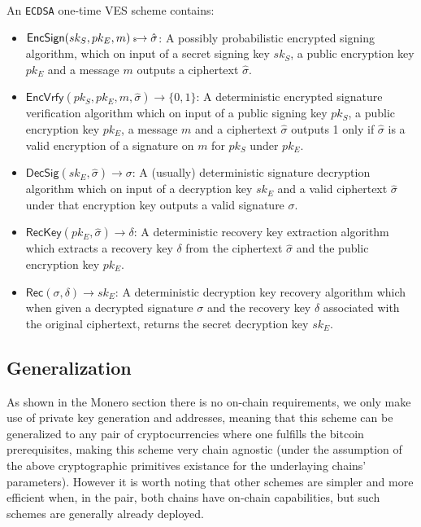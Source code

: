 \documentclass{llncs}
\newcommand{\EncSign}{\textsf{EncSign}}
\newcommand{\EncVer}{\textsf{EncVrfy}}
\newcommand{\DecSig}{\textsf{DecSig}}
\newcommand{\Rec}{\textsf{Rec}}
\newcommand{\RecKey}{\textsf{RecKey}}
\newcommand{\hatsigma}{\hat{\sigma}}
\newcommand{\skSign}{sk_S}
\newcommand{\pkSign}{pk_S}
\newcommand{\skEnc}{sk_E}
\newcommand{\pkEnc}{pk_E}
\newcommand{\rec}{\delta}
\newcommand{\bin}{\{0,1\}}
\begin{document}
\begin{definition}
    An \texttt{ECDSA} one-time VES scheme contains:
\begin{itemize}
    \item $\EncSign(\skSign, \pkEnc, m) \hskip2.3pt{\mbox{\tiny${\$}$\normalsize}}\!\!\rightarrow \hatsigma$: A possibly probabilistic encrypted signing algorithm, which on input of a secret signing key $\skSign$, a public encryption key $\pkEnc$ and a message $m$ outputs a ciphertext $\hatsigma$.
    \item $\EncVer(\pkSign, \pkEnc, m, \hatsigma) \rightarrow \bin$: A deterministic encrypted signature verification algorithm which on input of a public signing key $\pkSign$, a public encryption key $\pkEnc$, a message $m$ and a ciphertext $\hatsigma$ outputs 1 only if $\hatsigma$ is a valid encryption of a signature on $m$ for $\pkSign$ under $\pkEnc$.
    \item $\DecSig(\skEnc, \hatsigma) \rightarrow \sigma$: A (usually) deterministic signature decryption algorithm which on input of a decryption key $\skEnc$ and a valid ciphertext $\hatsigma$ under that encryption key  outputs a valid signature $\sigma$.
    \item $\RecKey(\pkEnc, \hatsigma) \rightarrow \delta$: A deterministic recovery key extraction algorithm which extracts a recovery key $\delta$ from the ciphertext $\hatsigma$ and the public encryption key $\pkEnc$.
    \item $\Rec(\sigma,\rec) \rightarrow \skEnc$: A deterministic decryption key recovery algorithm which when given a decrypted signature $\sigma$ and the recovery key $\rec$ associated with the original ciphertext, returns the secret decryption key $\skEnc$.
\end{itemize}
\end{definition}

\subsection{Generalization}
As shown in the Monero section there is no on-chain requirements, we only make use of private key generation and addresses, meaning that this scheme can be generalized to any pair of cryptocurrencies where one fulfills the bitcoin prerequisites, making this scheme very chain agnostic (under the assumption of the above cryptographic primitives existance for the underlaying chains' parameters). However it is worth noting that other schemes are simpler and more efficient when, in the pair, both
chains have on-chain capabilities, but such schemes are generally already deployed.
\end{document}
